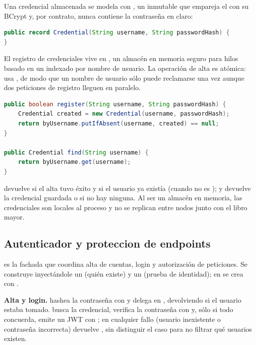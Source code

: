 Una credencial almacenada se modela con , un
 inmutable que empareja el  con su
 BCrypt y, por contrato, nunca contiene la contraseña en
claro:

\begin{lstlisting}[language=Java,caption={Credential: record inmutable}]
public record Credential(String username, String passwordHash) {
}
\end{lstlisting}

El registro de credenciales vive en , un
almacén en memoria seguro para hilos basado en un
 indexado por nombre de usuario. La
operación de alta es atómica:  usa
, de modo que un nombre de usuario sólo puede reclamarse una
vez aunque dos peticiones de registro lleguen en paralelo.

\begin{lstlisting}[language=Java,caption={CredentialStore: alta atomica y busqueda}]
public boolean register(String username, String passwordHash) {
    Credential created = new Credential(username, passwordHash);
    return byUsername.putIfAbsent(username, created) == null;
}

public Credential find(String username) {
    return byUsername.get(username);
}
\end{lstlisting}

 devuelve  si el alta tuvo éxito y  si
el usuario ya existía (cuando  no es ); y
 devuelve la credencial guardada o  si no hay
ninguna. Al ser un almacén en memoria, las credenciales son locales al proceso y
no se replican entre nodos junto con el libro mayor.

\subsection{Autenticador y proteccion de endpoints}

 es la fachada que coordina alta de cuentas,
login y autorización de peticiones. Se construye inyectándole un
 (quién existe) y un  (prueba de identidad);
en  se crea con .

\textbf{Alta y login.}  hashea la contraseña
con  y delega en , devolviendo
 si el usuario estaba tomado. 
busca la credencial, verifica la contraseña con  y, sólo
si todo concuerda, emite un JWT con ; en cualquier
fallo (usuario inexistente o contraseña incorrecta) devuelve , sin
distinguir el caso para no filtrar qué usuarios existen.

